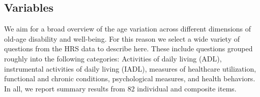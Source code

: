 \documentclass{article}
\begin{document}


\subsection*{Variables}
We aim for a broad overview of the age variation across different dimensions of
old-age disability and well-being. For this reason we select a wide variety of
questions from the HRS data to describe here. These include questions
grouped roughly into the following categories: Activities of daily living (ADL),
instrumental activities of daily living (IADL), measures of healthcare utilization, functional and chronic conditions, psychological
measures, and health behaviors. In all, we report summary results from 82
individual and composite items.
\end{document}
